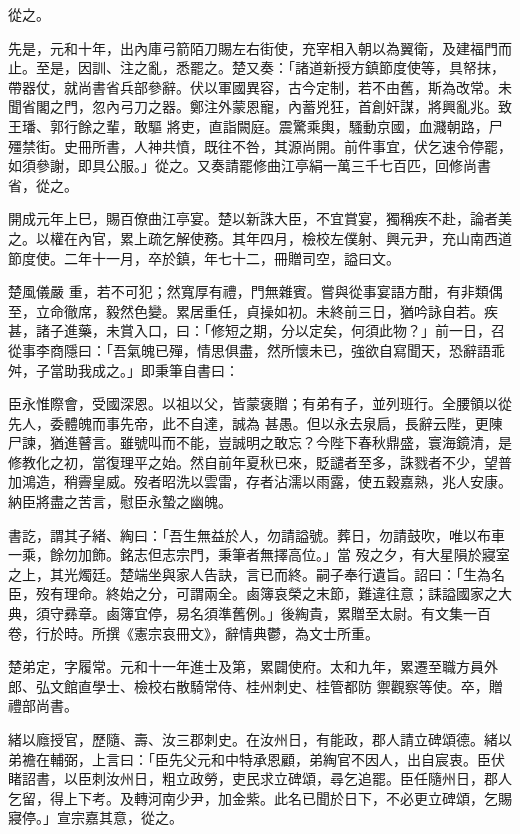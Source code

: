 \begin{pinyinscope}
 從之。



 先是，元和十年，出內庫弓箭陌刀賜左右街使，充宰相入朝以為翼衛，及建福門而止。至是，因訓、注之亂，悉罷之。楚又奏：「諸道新授方鎮節度使等，具帑抹，帶器仗，就尚書省兵部參辭。伏以軍國異容，古今定制，若不由舊，斯為改常。未聞省閣之門，忽內弓刀之器。鄭注外蒙恩寵，內蓄兇狂，首創奸謀，將興亂兆。致王璠、郭行餘之輩，敢驅
 將吏，直詣闕庭。震驚乘輿，騷動京國，血濺朝路，尸殭禁街。史冊所書，人神共憤，既往不咎，其源尚開。前件事宜，伏乞速令停罷，如須參謝，即具公服。」從之。又奏請罷修曲江亭絹一萬三千七百匹，回修尚書省，從之。



 開成元年上巳，賜百僚曲江亭宴。楚以新誅大臣，不宜賞宴，獨稱疾不赴，論者美之。以權在內官，累上疏乞解使務。其年四月，檢校左僕射、興元尹，充山南西道節度使。二年十一月，卒於鎮，年七十二，冊贈司空，謚曰文。



 楚風儀嚴
 重，若不可犯；然寬厚有禮，門無雜賓。嘗與從事宴語方酣，有非類偶至，立命徹席，毅然色變。累居重任，貞操如初。未終前三日，猶吟詠自若。疾甚，諸子進藥，未賞入口，曰：「修短之期，分以定矣，何須此物？」前一日，召從事李商隱曰：「吾氣魄已殫，情思俱盡，然所懷未已，強欲自寫聞天，恐辭語乖舛，子當助我成之。」即秉筆自書曰：



 臣永惟際會，受國深恩。以祖以父，皆蒙褒贈；有弟有子，並列班行。全腰領以從先人，委體魄而事先帝，此不自達，誠為
 甚愚。但以永去泉扃，長辭云陛，更陳尸諫，猶進瞽言。雖號叫而不能，豈誠明之敢忘？今陛下春秋鼎盛，寰海鏡清，是修教化之初，當復理平之始。然自前年夏秋已來，貶譴者至多，誅戮者不少，望普加鴻造，稍霽皇威。歿者昭洗以雲雷，存者沾濡以雨露，使五穀嘉熟，兆人安康。納臣將盡之苦言，慰臣永蟄之幽魄。



 書訖，謂其子緒、綯曰：「吾生無益於人，勿請謚號。葬日，勿請鼓吹，唯以布車一乘，餘勿加飾。銘志但志宗門，秉筆者無擇高位。」當
 歿之夕，有大星隕於寢室之上，其光燭廷。楚端坐與家人告訣，言已而終。嗣子奉行遺旨。詔曰：「生為名臣，歿有理命。終始之分，可謂兩全。鹵簿哀榮之末節，難違往意；誄謚國家之大典，須守彞章。鹵簿宜停，易名須準舊例。」後綯貴，累贈至太尉。有文集一百卷，行於時。所撰《憲宗哀冊文》，辭情典鬱，為文士所重。



 楚弟定，字履常。元和十一年進士及第，累闢使府。太和九年，累遷至職方員外郎、弘文館直學士、檢校右散騎常侍、桂州刺史、桂管都防
 禦觀察等使。卒，贈禮部尚書。



 緒以廕授官，歷隨、壽、汝三郡刺史。在汝州日，有能政，郡人請立碑頌德。緒以弟襜在輔弼，上言曰：「臣先父元和中特承恩顧，弟綯官不因人，出自宸衷。臣伏睹詔書，以臣刺汝州日，粗立政勞，吏民求立碑頌，尋乞追罷。臣任隨州日，郡人乞留，得上下考。及轉河南少尹，加金紫。此名已聞於日下，不必更立碑頌，乞賜寢停。」宣宗嘉其意，從之。




\end{pinyinscope}
